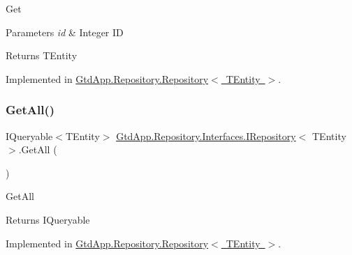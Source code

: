 Get 


\begin{DoxyParams}{Parameters}
{\em id} & Integer ID\\
\hline
\end{DoxyParams}
\begin{DoxyReturn}{Returns}
T\+Entity
\end{DoxyReturn}


Implemented in \mbox{\hyperlink{class_gtd_app_1_1_repository_1_1_repository_a95123d874c390a6707a12d17fd9b274b}{Gtd\+App.\+Repository.\+Repository$<$ T\+Entity $>$}}.

\mbox{\label{interface_gtd_app_1_1_repository_1_1_interfaces_1_1_i_repository_a1c97e47c04c2d00061a30fad1aabb977}} 
\subsubsection{\texorpdfstring{Get\+All()}{GetAll()}}
{\footnotesize\ttfamily I\+Queryable$<$T\+Entity$>$ \mbox{\hyperlink{interface_gtd_app_1_1_repository_1_1_interfaces_1_1_i_repository}{Gtd\+App.\+Repository.\+Interfaces.\+I\+Repository}}$<$ T\+Entity $>$.Get\+All (\begin{DoxyParamCaption}{ }\end{DoxyParamCaption})}



Get\+All 

\begin{DoxyReturn}{Returns}
I\+Queryable
\end{DoxyReturn}


Implemented in \mbox{\hyperlink{class_gtd_app_1_1_repository_1_1_repository_a63de411b4f50ec975c4a9db03ec36143}{Gtd\+App.\+Repository.\+Repository$<$ T\+Entity $>$}}.

\mbox{\label{interface_gtd_app_1_1_repository_1_1_interfaces_1_1_i_repository_ae140e5af29d395235ea159f58ecf5b47}} 
